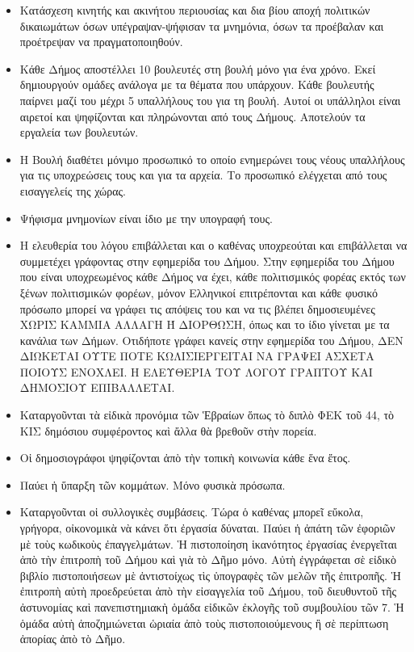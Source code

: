 \documentclass[a4paper]{article}
\begin{document}
\begin{itemize}
\item Κατάσχεση κινητής και ακινήτου περιουσίας και δια βίου αποχή πολιτικών δικαιωμάτων όσων υπέγραψαν-ψήφισαν τα μνημόνια, όσων τα προέβαλαν και προέτρεψαν να πραγματοποιηθούν.
\item Κάθε Δήμος αποστέλλει 10 βουλευτές στη βουλή μόνο για ένα χρόνο. Εκεί δημιουργούν ομάδες ανάλογα με τα θέματα που υπάρχουν. Κάθε βουλευτής παίρνει μαζί του μέχρι 5 υπαλλήλους του για τη βουλή. Αυτοί οι υπάλληλοι είναι αιρετοί και ψηφίζονται και πληρώνονται από τους Δήμους. Αποτελούν τα εργαλεία των βουλευτών.
\item Η Βουλή διαθέτει μόνιμο προσωπικό το οποίο ενημερώνει τους νέους υπαλλήλους για τις υποχρεώσεις τους και για τα αρχεία. Το προσωπικό ελέγχεται από τους εισαγγελείς της χώρας.
\item Ψήφισμα μνημονίων είναι ίδιο με την υπογραφή τους.
\item Η ελευθερία του λόγου επιβάλλεται και ο καθένας υποχρεούται και επιβάλλεται να συμμετέχει γράφοντας στην εφημερίδα του Δήμου. Στην εφημερίδα του Δήμου που είναι υποχρεωμένος κάθε Δήμος να έχει, κάθε πολιτισμικός φορέας εκτός των ξένων πολιτισμικών φορέων, μόνον Ελληνικοί επιτρέπονται και κάθε φυσικό πρόσωπο μπορεί να γράφει τις απόψεις του και να τις βλέπει δημοσιευμένες ΧΩΡΙΣ ΚΑΜΜΙΑ ΑΛΛΑΓΗ Ή ΔΙΟΡΘΩΣΗ, όπως και το ίδιο γίνεται με τα κανάλια των Δήμων. Οτιδήποτε γράφει κανείς στην εφημερίδα του Δήμου, ΔΕΝ ΔΙΩΚΕΤΑΙ ΟΥΤΕ ΠΟΤΕ ΚΩΛΙΣΙΕΡΓΕΙΤΑΙ ΝΑ ΓΡΑΨΕΙ ΑΣΧΕΤΑ ΠΟΙΟΥΣ ΕΝΟΧΛΕΙ. Η ΕΛΕΥΘΕΡΙΑ ΤΟΥ ΛΟΓΟΥ ΓΡΑΠΤΟΥ ΚΑΙ ΔΗΜΟΣΙΟΥ ΕΠΙΒΑΛΛΕΤΑΙ.
\item Καταργοῦνται τὰ εἰδικὰ προνόμια τῶν Ἑβραίων ὅπως τὸ διπλὸ ΦΕΚ τοῦ 44, τὸ ΚΙΣ δημόσιου συμφέροντος καὶ ἄλλα θὰ βρεθοῦν στὴν πορεία.
\item Οἱ δημοσιογράφοι ψηφίζονται ἀπὸ τὴν τοπικὴ κοινωνία κάθε ἕνα ἔτος.
\item Παύει ἡ ὕπαρξη τῶν κομμάτων. Μόνο φυσικὰ πρόσωπα.
\item Καταργοῦνται οἱ συλλογικὲς συμβάσεις. Τώρα ὁ καθένας μπορεῖ εὔκολα, γρήγορα, οἰκονομικὰ νὰ κάνει ὅτι ἐργασία δύναται. Παύει ἡ ἀπάτη τῶν ἐφοριῶν μὲ τοὺς κωδικοὺς ἐπαγγελμάτων. Ἡ πιστοποίηση ἱκανότητος ἐργασίας ἐνεργεῖται ἀπὸ τὴν ἐπιτροπὴ τοῦ Δήμου καὶ γιὰ τὸ Δῆμο μόνο. Αὐτὴ ἐγγράφεται σὲ εἰδικὸ βιβλίο πιστοποιήσεων μὲ ἀντιστοίχως τὶς ὑπογραφὲς τῶν μελῶν τῆς ἐπιτροπῆς. Ἡ ἐπιτροπὴ αὐτὴ προεδρεύεται ἀπὸ τὴν εἰσαγγελία τοῦ Δήμου, τοῦ διευθυντοῦ τῆς ἀστυνομίας καὶ πανεπιστημιακὴ ὁμάδα εἰδικῶν ἐκλογῆς τοῦ συμβουλίου τῶν 7. Ἡ ὁμάδα αὐτὴ ἀποζημιώνεται ὡριαία ἀπὸ τοὺς πιστοποιούμενους ἢ σὲ περίπτωση ἀπορίας ἀπὸ τὸ Δῆμο.

\end{itemize}
\end{document}
